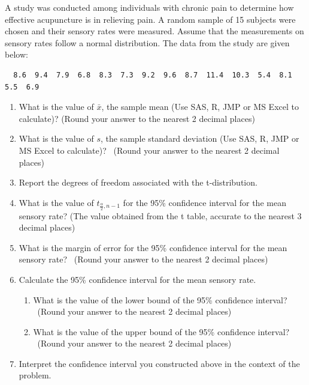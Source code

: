 \item A study was conducted among individuals with chronic pain to determine how effective acupuncture is in relieving pain. A random sample of 15 subjects were chosen and their sensory rates were measured. Assume that the measurements on sensory rates follow a  normal distribution. The data from the study are given below:


\begin{verbatim}
  8.6  9.4  7.9  6.8  8.3  7.3  9.2  9.6  8.7  11.4  10.3  5.4  8.1  5.5  6.9
\end{verbatim}

\begin{enumerate}
      \item What is the value of $\bar{x}$, the sample mean (Use SAS, R, JMP or MS Excel to calculate)?  (Round your answer to the nearest 2 decimal places) \\ %
     \item What is the value of $s$, the sample standard deviation (Use SAS, R, JMP or MS Excel to calculate)? \ (Round your answer to the nearest 2 decimal places) \\ %
     \item Report the degrees of freedom associated with the t-distribution.\\
     \item What is the value of $t_{\frac{\alpha}{2},n-1}$ for the 95\% confidence interval for the mean sensory rate? (The value obtained from the t table, accurate to the nearest 3 decimal places) \\ %
      \item What is the margin of error for the 95\% confidence interval for the mean sensory rate? \ (Round your answer to the nearest 2 decimal places) \\ %
      \item Calculate the 95\% confidence interval for the mean sensory rate.
      \begin{enumerate}
      \item What is the value of the lower bound of the 95\% confidence interval? \ (Round your answer to the nearest 2 decimal places) %
      \item What is the value of the upper bound of the 95\% confidence interval?  \ (Round your answer to the nearest 2 decimal places)\\ %
\end{enumerate}
\item  Interpret the confidence interval you constructed above in the context of the problem.\\


\end{enumerate}
